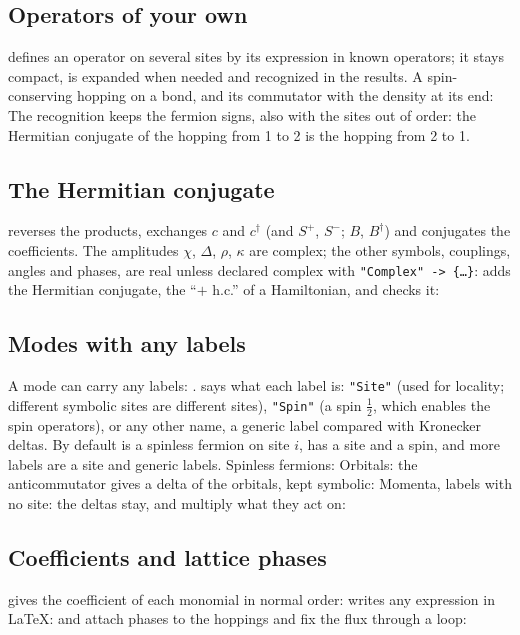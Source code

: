 \documentclass[11pt,a4paper]{article}
\begin{document}
\subsection{Operators of your own}
 defines an operator on several sites by its expression in known operators; it stays compact, is
expanded when needed and recognized in the results. A spin-conserving hopping on a bond, and its commutator with the
density at its end:
The recognition keeps the fermion signs, also with the sites out of order: the Hermitian conjugate of the hopping from
1 to 2 is the hopping from 2 to 1.

\subsection{The Hermitian conjugate}
 reverses the products, exchanges $c$ and $c^\dagger$ (and $S^+$, $S^-$; $B$, $B^\dagger$) and conjugates the
coefficients. The amplitudes $\chi$, $\Delta$, $\rho$, $\kappa$ are complex; the other symbols, couplings, angles and phases,
are real unless declared complex with \texttt{"Complex" -> \{\dots\}}:
 adds the Hermitian conjugate, the ``$+$ h.c.'' of a Hamiltonian, and  checks it:

\subsection{Modes with any labels}
A mode can carry any labels: .  says what each label is: \texttt{"Site"} (used for
locality; different symbolic sites are different sites), \texttt{"Spin"} (a spin $\frac12$, which enables the spin operators),
or any other name, a generic label compared with Kronecker deltas. By default  is a spinless fermion on site $i$,
 has a site and a spin, and more labels are a site and generic labels. Spinless fermions:
Orbitals: the anticommutator gives a delta of the orbitals, kept symbolic:
Momenta, labels with no site: the deltas stay, and multiply what they act on:

\subsection{Coefficients and lattice phases}
 gives the coefficient of each monomial in normal order:
 writes any expression in \LaTeX:
 and  attach phases to the hoppings and fix the flux through a loop:
\end{document}
